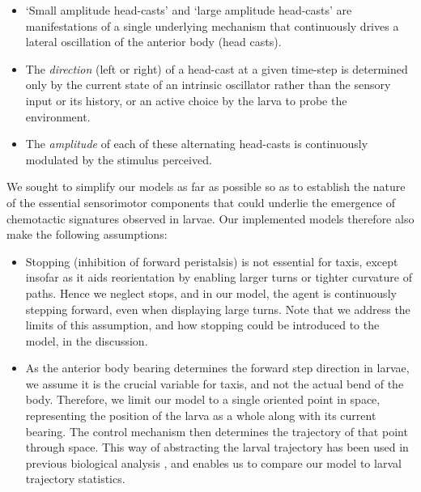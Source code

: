 \documentclass[11pt,a4paper]{article}
\begin{document}
\begin{itemize}

\item ‘Small amplitude head-casts’ and ‘large amplitude head-casts’ \citep{gomez2014multilevel} are manifestations of a single underlying mechanism that continuously drives a lateral oscillation of the anterior body (head casts). 

\item The {\it direction} (left or right) of a head-cast at a given time-step is determined only by the current state of an intrinsic oscillator rather than the sensory input or its history, or an active choice by the larva to probe the environment.

\item The {\it amplitude} of each of these alternating head-casts is continuously modulated by the stimulus perceived.

\end{itemize}

We sought to simplify our models as far as possible so as to establish the nature of the essential sensorimotor components that could underlie the emergence of chemotactic signatures observed in larvae. Our implemented models therefore also make the following assumptions:

\begin{itemize}

\item Stopping (inhibition of forward peristalsis) is not essential for taxis, except insofar as it aids reorientation by enabling larger turns or tighter curvature of paths. Hence we neglect stops, and in our model, the agent is continuously stepping forward, even when displaying large turns. Note that we address the limits of this assumption, and how stopping could be introduced to the model, in the discussion.

\item As the anterior body bearing determines the forward step direction in larvae, we assume it is the crucial variable for taxis, and not the actual bend of the body. Therefore, we limit our model to a single oriented point in space, representing the position of the larva as a whole along with its current bearing. The control mechanism then determines the trajectory of that point through space. 
This way of abstracting the larval trajectory has been used in previous biological analysis \citep{louis2008bilateral}, and enables us to compare our model to larval trajectory statistics. 

\end{itemize}
\end{document}
